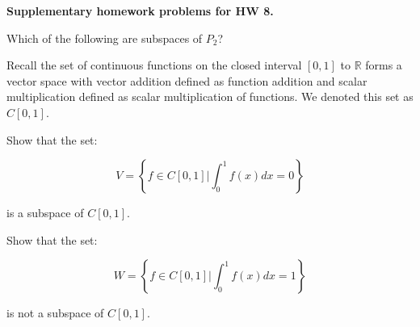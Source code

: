 \documentclass[10pt]{exam}
\begin{document}
{\bf Supplementary homework problems for HW 8.}

\begin{questions}


\question Which of the following are subspaces of $P_2$?


\question Recall the set of continuous functions on the closed interval $[0,1]$ to $\mathbb{R}$ forms a vector space with vector addition defined as function addition and scalar multiplication defined as scalar multiplication of functions.  We denoted this set as $C[0,1]$.

Show that the set:

\[ V = \left \{ f\in C[0,1] \Big | \int_0^1 f(x)dx =0  \right\}\]

is a subspace of $C[0,1]$.  

\question Show that the set:

\[ W = \left \{ f\in C[0,1] \Big | \int_0^1 f(x)dx =1  \right\}\]

is not a subspace of $C[0,1]$.  




\end{questions}
\end{document}
